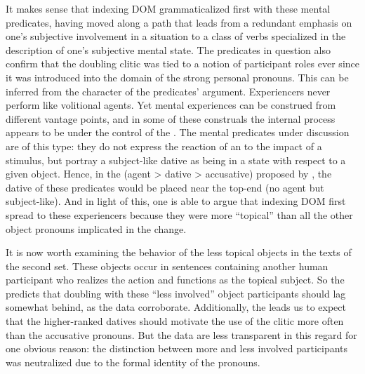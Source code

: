 \documentclass[output=paper]{LSP/langsci}
\begin{document}
 It makes sense that indexing DOM grammaticalized first with these mental predicates, having moved along a path that leads from a redundant emphasis on one’s subjective involvement in a situation to a class of verbs specialized in the description of one’s subjective mental state. The predicates in question also confirm that the doubling clitic was tied to a notion of participant roles ever since it was introduced into the domain of the strong personal pronouns. This can be inferred from the character of the predicates'  argument. Experiencers never perform like volitional agents. Yet mental experiences can be construed from different vantage points, and in some of these construals the internal process appears to be under the control of the . The mental predicates under discussion are of this type: they do not express the reaction of an  to the impact of a stimulus, but portray a subject-like dative  as being in a state with respect to a given object. Hence, in the  (agent > dative > accusative) proposed by \citet[152]{Givon1976Topic}, the dative  of these predicates would be placed near the top-end (no agent but subject-like). And in light of this, one is able to argue that  indexing DOM first spread to these experiencers because they were more “topical” than all the other object pronouns implicated in the change. 

 It is now worth examining the behavior of the less topical objects in the texts of the second set. These objects occur in sentences containing another human participant who realizes the action and functions as the topical subject. So the  predicts that doubling with these “less involved” object participants should lag somewhat behind, as the data corroborate. Additionally, the  leads us to expect that the higher-ranked datives should motivate the use of the clitic more often than the accusative pronouns. But the data are less transparent in this regard for one obvious reason: the distinction between more and less involved participants was neutralized due to the formal identity of the pronouns. 
\end{document}

